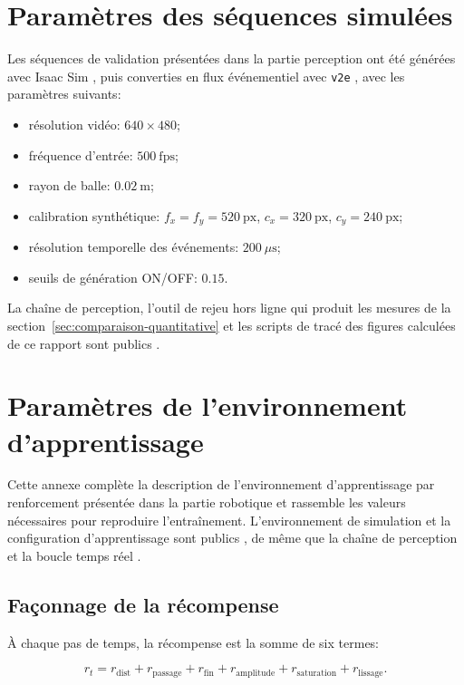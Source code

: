 \documentclass[a4paper,11pt]{report}
\begin{document}
\chapter{Paramètres des séquences simulées}
\label{ann:sequences}

Les séquences de validation présentées dans la partie perception ont été générées avec Isaac Sim \cite{nvidia-isaac-sim}, puis converties en flux événementiel avec \texttt{v2e} \cite{v2e-github,v2e-paper}, avec les paramètres suivants:

\begin{itemize}
  \item résolution vidéo: \(640 \times 480\);
  \item fréquence d'entrée: \(500~\text{fps}\);
  \item rayon de balle: \(0.02~\text{m}\);
  \item calibration synthétique: \(f_x=f_y=520~\text{px}\), \(c_x=320~\text{px}\), \(c_y=240~\text{px}\);
  \item résolution temporelle des événements: \(200~\mu\text{s}\);
  \item seuils de génération ON/OFF: \(0.15\).
\end{itemize}

La chaîne de perception, l'outil de rejeu hors ligne qui produit les mesures de la section~\ref{sec:comparaison-quantitative} et les scripts de tracé des figures calculées de ce rapport sont publics \cite{repo-stage}.

\chapter{Paramètres de l'environnement d'apprentissage}
\label{ann:env-apprentissage}

Cette annexe complète la description de l'environnement d'apprentissage par
renforcement présentée dans la partie robotique et rassemble les valeurs
nécessaires pour reproduire l'entraînement. L'environnement de simulation et la
configuration d'apprentissage sont publics \cite{repo-isaac}, de même que la
chaîne de perception et la boucle temps réel \cite{repo-stage}.

\section*{Façonnage de la récompense}

À chaque pas de temps, la récompense est la somme de six termes:

\begin{equation}
r_t = r_{\text{dist}} + r_{\text{passage}} + r_{\text{fin}}
      + r_{\text{amplitude}} + r_{\text{saturation}} + r_{\text{lissage}}.
\label{eq:reward-total}
\end{equation}
\end{document}
